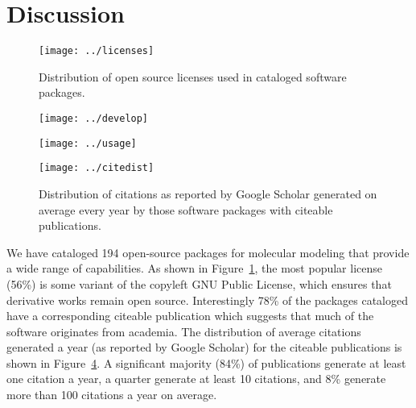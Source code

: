 \section{Discussion}

\begin{figure}
\centering 
\texttt{[image: ../licenses]}
\caption{\label{licenses} Distribution of open source licenses used in cataloged software packages.}
\end{figure}

\begin{figure*}
\centering
\begin{subfigure}[t]{.4\linewidth}
\centering 
\texttt{[image: ../develop]}
\caption{\label{develop}}
\end{subfigure}
\hfill
\begin{subfigure}[t]{.4\linewidth}
\centering 
\texttt{[image: ../usage]}
\caption{\label{usage}}
\end{subfigure}
\caption{\label{pies} Activity distributions of cataloged software packages.
() Distribution of development activity. () Distribution of user activity.
}
\end{figure*}

\begin{figure}
\centering 
\texttt{[image: ../citedist]}
\caption{\label{cites} Distribution of citations as reported by Google Scholar generated on average every year by those software packages with citeable publications.}
\end{figure}


We have cataloged 194 open-source packages for molecular modeling that provide a wide range of capabilities.  As shown in Figure~\ref{licenses}, the most popular license (56\%) is some variant of the copyleft GNU Public License, which ensures that derivative works remain open source.  Interestingly 78\% of the packages cataloged have a corresponding citeable publication which suggests that much of the software originates from academia.   The distribution of average citations generated a year (as reported by Google Scholar) for the citeable publications is shown in Figure~\ref{cites}.  A significant majority (84\%) of publications generate at least one citation a year, a quarter generate at least 10 citations, and 8\% generate more than 100 citations a year on average.

